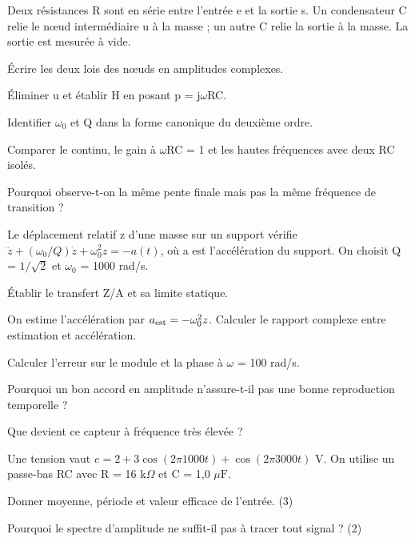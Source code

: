 \label{ex-D2}
Deux résistances R sont en série entre l’entrée e et la sortie s. Un condensateur C relie le nœud intermédiaire u à la masse ; un autre C relie la sortie à la masse. La sortie est mesurée à vide.\begin{questions}
\item Écrire les deux lois des nœuds en amplitudes complexes.
\item Éliminer u et établir H en posant p = j\ensuremath{\omega}RC.
\item Identifier \ensuremath{\omega_0} et Q dans la forme canonique du deuxième ordre.
\item Comparer le continu, le gain à \ensuremath{\omega}RC = 1 et les hautes fréquences avec deux RC isolés.
\item Pourquoi observe-t-on la même pente finale mais pas la même fréquence de transition ?
\end{questions}


\label{ex-D3}
Le déplacement relatif z d’une masse sur un support vérifie $\ddot z+(\omega_0/Q)\dot z+\omega_0^2z=-a(t)$, où a est l’accélération du support. On choisit Q = $1/\sqrt2$ et \ensuremath{\omega_0} = 1000 rad/s.\begin{questions}
\item Établir le transfert Z/A et sa limite statique.
\item On estime l’accélération par $a_{\rm est}=-\omega_0^2z$. Calculer le rapport complexe entre estimation et accélération.
\item Calculer l’erreur sur le module et la phase à \ensuremath{\omega} = 100 rad/s.
\item Pourquoi un bon accord en amplitude n’assure-t-il pas une bonne reproduction temporelle ?
\item Que devient ce capteur à fréquence très élevée ?
\end{questions}


Une tension vaut $e=2+3\cos(2\pi1000t)+\cos(2\pi3000t)$ V. On utilise un passe-bas RC avec R = 16 k$\Omega$ et C = 1,0 $\mu\mathrm F$.
\begin{questions}
\item Donner moyenne, période et valeur efficace de l’entrée. (3)
\item Pourquoi le spectre d’amplitude ne suffit-il pas à tracer tout signal ? (2)
\end{questions}

